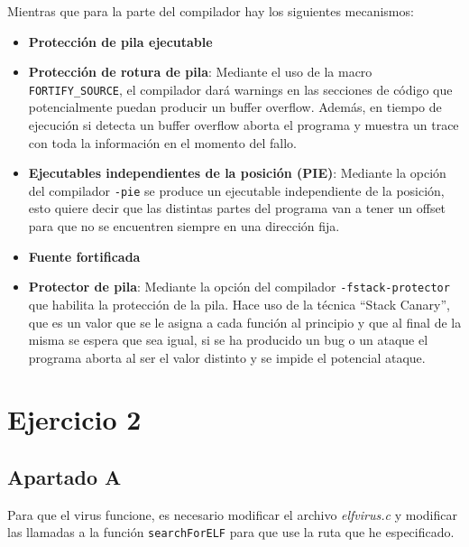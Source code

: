 \documentclass{article}
\begin{document}
\bigskip

Mientras que para la parte del compilador hay los siguientes mecanismos:

\begin{itemize}
    \item \textbf{Protección de pila ejecutable}
    \item \textbf{Protección de rotura de pila}: Mediante el uso de la macro \verb|FORTIFY_SOURCE|, el compilador dará warnings en las secciones de código que potencialmente puedan producir un buffer overflow. Además, en tiempo de ejecución si detecta un buffer overflow aborta el programa y muestra un trace con toda la información en el momento del fallo.
    \item \textbf{Ejecutables independientes de la posición (PIE)}: Mediante la opción del compilador \verb|-pie| se produce un ejecutable independiente de la posición, esto quiere decir que las distintas partes del programa van a tener un offset para que no se encuentren siempre en una dirección fija.
    \item \textbf{Fuente fortificada}
    \item \textbf{Protector de pila}: Mediante la opción del compilador \verb|-fstack-protector| que habilita la protección de la pila. Hace uso de la técnica ``Stack Canary'', que es un valor que se le asigna a cada función al principio y que al final de la misma se espera que sea igual, si se ha producido un bug o un ataque el programa aborta al ser el valor distinto y se impide el potencial ataque.
\end{itemize}

\newpage

{}
\section*{Ejercicio 2}

{}
\subsection*{Apartado A}

Para que el virus funcione, es necesario modificar el archivo \textit{elfvirus.c} y modificar las llamadas a la función \verb|searchForELF| para que use la ruta que he especificado.
\end{document}
